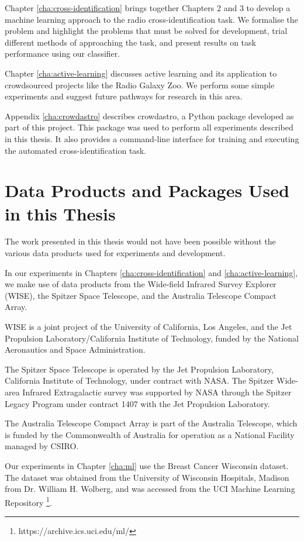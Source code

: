   Chapter \ref{cha:cross-identification} brings together Chapters 2 and 3 to
  develop a machine learning approach to the radio cross-identification task. We
  formalise the problem and highlight the problems that must be solved for
  development, trial different methods of approaching the task, and present
  results on task performance using our classifier.

  Chapter \ref{cha:active-learning} discusses active learning and its
  application to crowdsourced projects like the Radio Galaxy Zoo. We perform
  some simple experiments and suggest future pathways for research in this area.

  Appendix \ref{cha:crowdastro} describes crowdastro, a Python package developed
  as part of this project. This package was used to perform all experiments
  described in this thesis. It also provides a command-line interface for
  training and executing the automated cross-identification task.

\section{Data Products and Packages Used in this Thesis}
\label{sec:data-products}
  
  The work presented in this thesis would not have been possible without the
  various data products used for experiments and development.

  In our experiments in Chapters \ref{cha:cross-identification} and
  \ref{cha:active-learning}, we make use of data products from the Wide-field
  Infrared Survey Explorer (WISE), the Spitzer Space Telescope, and the
  Australia Telescope Compact Array.

  WISE is a joint project of the University of California, Los Angeles, and the
  Jet Propulsion Laboratory/California Institute of Technology, funded by the
  National Aeronautics and Space Administration.

  The Spitzer Space Telescope is operated by the Jet Propulsion Laboratory,
  California Institute of Technology, under contract with NASA. The Spitzer
  Wide-area Infrared Extragalactic survey was supported by NASA through the
  Spitzer Legacy Program under contract 1407 with the Jet Propulsion Laboratory.

  The Australia Telescope Compact Array is part of the Australia Telescope,
  which is funded by the Commonwealth of Australia for operation as a National
  Facility managed by CSIRO.

  Our experiments in Chapter \ref{cha:ml} use the Breast Cancer Wisconsin
  dataset. The dataset was obtained from the University of Wisconsin Hospitals,
  Madison from Dr. William H. Wolberg, and was accessed from the UCI Machine
  Learning Repository \footnote{https://archive.ics.uci.edu/ml/}.

